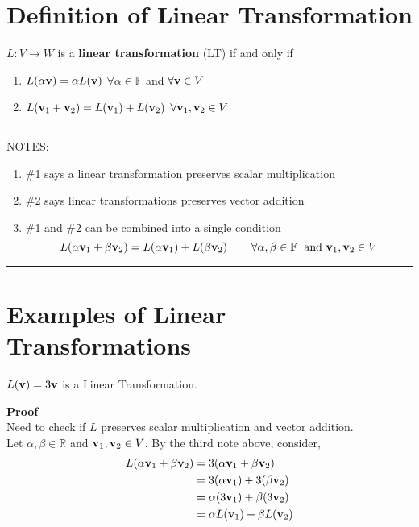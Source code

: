 \section{Definition of Linear Transformation}
\begin{definition}
	$L: V \to W$ is a \textbf{linear transformation} (LT) if and only if
	\begin{enumerate}
		\item $L(\alpha {\bf v}) = \alpha L({\bf v})$ \hspace{0.5cm} $\forall \alpha \in \mathbb{F}$  \;  and \;    $\forall {\bf v} \in V$
		\item $L({\bf v}_1 + {\bf v}_2) = L({\bf v}_1)+ L({\bf v}_2)$ \; $\forall {\bf v}_1, {\bf v}_2 \in V$
	\end{enumerate}
	
\rule[0.01in]{\textwidth}{0.0025in}

	NOTES: 
	\begin{enumerate}
		\item  \#1 says a linear transformation preserves scalar multiplication
		\item \#2 says linear transformations preserves vector addition 
		\item \#1 and \#2 can be combined into a single condition
		\[ L(\alpha {\bf v}_1 + \beta {\bf v}_2) = L(\alpha {\bf v}_1) + L(\beta {\bf v}_2)  \hspace{0.75cm} \forall  \alpha, \beta \in \mathbb{F} \; \text{ and } {\bf v}_1, {\bf v}_2 \in V  \]
		\end{enumerate}
\end{definition}
 
 	
\rule[0.01in]{\textwidth}{0.0025in}

 
 
 
 \section{Examples of Linear Transformations}
\begin{example}
$L({\bf v}) = 3{\bf v}$  is a Linear Transformation.

\textbf{Proof}\\
Need to check if $L$ preserves scalar multiplication and vector addition.\\
Let $\alpha, \beta \in \mathbb{R}$ and ${\bf v}_1, {\bf v}_2 \in V$.  By the third note above, consider, 
\begin{align*}
L(\alpha {\bf v}_1 + \beta {\bf v}_2) &= 3 (\alpha {\bf v}_1 + \beta {\bf v}_2)\\
							&= 3 (\alpha {\bf v}_1) + 3(\beta {\bf v}_2)\\
							&= \alpha (3 {\bf v}_1) + \beta (3 {\bf v}_2)\\
							&= \alpha L({\bf v}_1)  + \beta L({\bf v}_2)
\end{align*}
	
	
 
\end{example}

